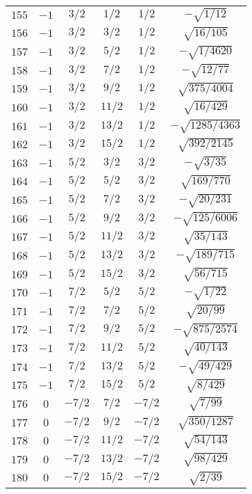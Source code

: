 \begin{table}
\begin{center}
\begin{tabular}{|c|c|c|c|c|c|}
$155$ & $-1$ & $3/2$ & $1/2$ & $1/2$ & $-\sqrt{1/12}$ \\ 
$156$ & $-1$ & $3/2$ & $3/2$ & $1/2$ & $\sqrt{16/105}$ \\ 
$157$ & $-1$ & $3/2$ & $5/2$ & $1/2$ & $-\sqrt{1/4620}$ \\ 
$158$ & $-1$ & $3/2$ & $7/2$ & $1/2$ & $-\sqrt{12/77}$ \\ 
$159$ & $-1$ & $3/2$ & $9/2$ & $1/2$ & $\sqrt{375/4004}$ \\ 
$160$ & $-1$ & $3/2$ & $11/2$ & $1/2$ & $\sqrt{16/429}$ \\ 
$161$ & $-1$ & $3/2$ & $13/2$ & $1/2$ & $-\sqrt{1285/4363}$ \\ 
$162$ & $-1$ & $3/2$ & $15/2$ & $1/2$ & $\sqrt{392/2145}$ \\ 
$163$ & $-1$ & $5/2$ & $3/2$ & $3/2$ & $-\sqrt{3/35}$ \\ 
$164$ & $-1$ & $5/2$ & $5/2$ & $3/2$ & $\sqrt{169/770}$ \\ 
$165$ & $-1$ & $5/2$ & $7/2$ & $3/2$ & $-\sqrt{20/231}$ \\ 
$166$ & $-1$ & $5/2$ & $9/2$ & $3/2$ & $-\sqrt{125/6006}$ \\ 
$167$ & $-1$ & $5/2$ & $11/2$ & $3/2$ & $\sqrt{35/143}$ \\ 
$168$ & $-1$ & $5/2$ & $13/2$ & $3/2$ & $-\sqrt{189/715}$ \\ 
$169$ & $-1$ & $5/2$ & $15/2$ & $3/2$ & $\sqrt{56/715}$ \\ 
$170$ & $-1$ & $7/2$ & $5/2$ & $5/2$ & $-\sqrt{1/22}$ \\ 
$171$ & $-1$ & $7/2$ & $7/2$ & $5/2$ & $\sqrt{20/99}$ \\ 
$172$ & $-1$ & $7/2$ & $9/2$ & $5/2$ & $-\sqrt{875/2574}$ \\ 
$173$ & $-1$ & $7/2$ & $11/2$ & $5/2$ & $\sqrt{40/143}$ \\ 
$174$ & $-1$ & $7/2$ & $13/2$ & $5/2$ & $-\sqrt{49/429}$ \\ 
$175$ & $-1$ & $7/2$ & $15/2$ & $5/2$ & $\sqrt{8/429}$ \\ 
$176$ & $0$ & $-7/2$ & $7/2$ & $-7/2$ & $\sqrt{7/99}$ \\ 
$177$ & $0$ & $-7/2$ & $9/2$ & $-7/2$ & $\sqrt{350/1287}$ \\ 
$178$ & $0$ & $-7/2$ & $11/2$ & $-7/2$ & $\sqrt{54/143}$ \\ 
$179$ & $0$ & $-7/2$ & $13/2$ & $-7/2$ & $\sqrt{98/429}$ \\ 
$180$ & $0$ & $-7/2$ & $15/2$ & $-7/2$ & $\sqrt{2/39}$ \\ 

\end{tabular}
\end{center}
\end{table}

